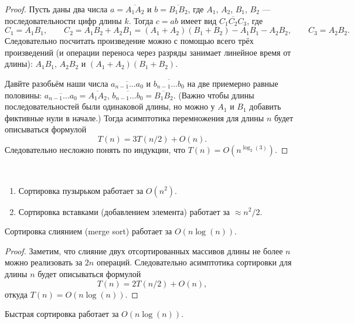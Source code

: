 \documentclass[12pt,a4paper]{article}
\begin{document}
    \begin{proof}
        Пусть даны два числа $a = \overline{A_1A_2}$ и $b = \overline{B_1B_2}$, где $A_1$, $A_2$, $B_1$, $B_2$ --- последовательности цифр длины $k$. Тогда $c = ab$ имеет вид $\overline{C_1C_2C_3}$, где
        \[
            C_1 = A_1 B_1,
            \qquad
            C_2 = A_1 B_2 + A_2 B_1 = (A_1 + A_2)(B_1 + B_2) - A_1 B_1 - A_2 B_2,
            \qquad
            C_3 = A_2 B_2.
        \]
        Следовательно посчитать произведение можно с помощью всего трёх произведений (и операции переноса через разряды занимает линейное время от длины): $A_1 B_1$, $A_2 B_2$ и $(A_1 + A_2) (B_1 + B_2)$.

        Давйте разобьём наши числа $\overline{a_{n-1}\dots a_0}$ и $\overline{b_{n-1}\dots b_0}$ на две приемерно равные половины: $\overline{a_{n-1}\dots a_0} = \overline{A_1A_2}$, $\overline{b_{n-1}\dots b_0} = \overline{B_1B_2}$. (Важно чтобы длины последовательностей были одинаковой длины, но можно у $A_1$ и $B_1$ добавить фиктивные нули в начале.) Тогда асимптотика перемножения для длины $n$ будет описываться формулой
        \[T(n) = 3 T(n/2) + O(n).\]
        Следовательно несложно понять по индукции, что $T(n) = O(n^{\log_2(3)})$.
    \end{proof}

    \begin{theorem}\ 
        \begin{enumerate}
            \item Сортировка пузырьком работает за $O(n^2)$.
            \item Сортировка вставками (добавлением элемента) работает за $\approx n^2/2$.
        \end{enumerate}
    \end{theorem}

    \begin{theorem}
        Сортировка слиянием (merge sort) работает за $O(n\log(n))$.
    \end{theorem}

    \begin{proof}
        Заметим, что слияние двух отсортированных массивов длины не более $n$ можно реализовать за $2n$ операций. Следовательно асимптотика сортировки для длины $n$ будет описываться формулой
        \[T(n) = 2T(n/2) + O(n),\]
        откуда $T(n) = O(n \log(n))$.
    \end{proof}

    \begin{theorem}
        Быстрая сортировка работает за $O(n \log(n))$.
    \end{theorem}
\end{document}
